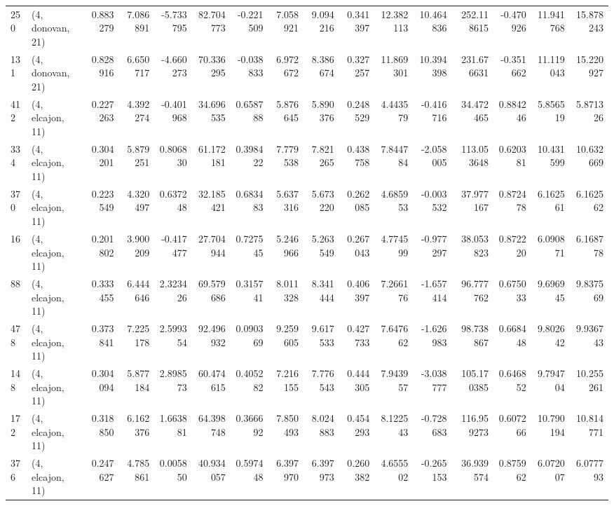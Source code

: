 \begin{tabular}{llrrrrrrrrrrrrrr}
250 &  (4, donovan, 21) &   0.883279 &   7.086891 &  -5.733795 &    82.704773 &  -0.221509 &   7.058921 &   9.094216 &  0.341397 &  12.382113 &  10.464836 &   252.118615 & -0.470926 &  11.941768 &  15.878243 \\
131 &  (4, donovan, 21) &   0.828916 &   6.650717 &  -4.660273 &    70.336295 &  -0.038833 &   6.972672 &   8.386674 &  0.327257 &  11.869301 &  10.394398 &   231.676631 & -0.351662 &  11.119043 &  15.220927 \\
412 &  (4, elcajon, 11) &   0.227263 &   4.392274 &  -0.401968 &    34.696535 &   0.658788 &   5.876645 &   5.890376 &  0.248529 &   4.443579 &  -0.416716 &    34.472465 &  0.884246 &   5.856519 &   5.871326 \\
334 &  (4, elcajon, 11) &   0.304201 &   5.879251 &   0.806830 &    61.172181 &   0.398422 &   7.779538 &   7.821265 &  0.438758 &   7.844784 &  -2.058005 &   113.053648 &  0.620381 &  10.431599 &  10.632669 \\
370 &  (4, elcajon, 11) &   0.223549 &   4.320497 &   0.637248 &    32.185421 &   0.683483 &   5.637316 &   5.673220 &  0.262085 &   4.685953 &  -0.003532 &    37.977167 &  0.872478 &   6.162561 &   6.162562 \\
16  &  (4, elcajon, 11) &   0.201802 &   3.900209 &  -0.417477 &    27.704944 &   0.727545 &   5.246966 &   5.263549 &  0.267043 &   4.774599 &  -0.977297 &    38.053823 &  0.872220 &   6.090871 &   6.168778 \\
88  &  (4, elcajon, 11) &   0.333455 &   6.444646 &   2.323426 &    69.579686 &   0.315741 &   8.011328 &   8.341444 &  0.406397 &   7.266176 &  -1.657414 &    96.777762 &  0.675033 &   9.696945 &   9.837569 \\
478 &  (4, elcajon, 11) &   0.373841 &   7.225178 &   2.599354 &    92.496932 &   0.090369 &   9.259605 &   9.617533 &  0.427733 &   7.647662 &  -1.626983 &    98.738867 &  0.668448 &   9.802642 &   9.936743 \\
148 &  (4, elcajon, 11) &   0.304094 &   5.877184 &   2.898573 &    60.474615 &   0.405282 &   7.216155 &   7.776543 &  0.444305 &   7.943957 &  -3.038777 &   105.170385 &  0.646852 &   9.794704 &  10.255261 \\
172 &  (4, elcajon, 11) &   0.318850 &   6.162376 &   1.663881 &    64.398748 &   0.366692 &   7.850493 &   8.024883 &  0.454293 &   8.122543 &  -0.728683 &   116.959273 &  0.607266 &  10.790194 &  10.814771 \\
376 &  (4, elcajon, 11) &   0.247627 &   4.785861 &   0.005850 &    40.934057 &   0.597448 &   6.397970 &   6.397973 &  0.260382 &   4.655502 &  -0.265153 &    36.939574 &  0.875962 &   6.072007 &   6.077793 \\

\end{tabular}
